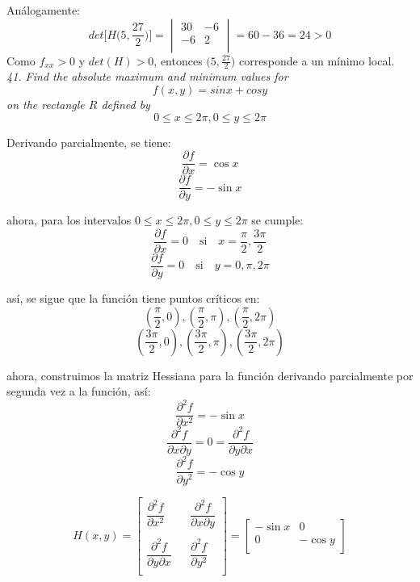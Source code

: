 \documentclass[a4paper,12pt]{article}
\begin{document}
				Análogamente:\\
				$$det \Big[H \Big(5, \frac{27}{2}\Big)\Big] =
						\begin{vmatrix}
							30 & -6 \\
							-6  & 2 \\
						\end{vmatrix} = 60 - 36 = 24 > 0
				$$
				Como $f_{xx} > 0$ y $det(H) > 0$, entonces $\Big(5, \frac{27}{2}\Big)$
				corresponde a un mínimo local.\\



	\textit{41. Find the absolute maximum and minimum values for
		$$f(x, y) = sin x + cos y$$ on the rectangle $R$ defined by
		$$0 \leq x \leq 2\pi, 0 \leq y \leq 2\pi$$}

		Derivando parcialmente, se tiene:
		$$\frac{\partial f}{\partial x} = \cos x $$
		$$\frac{\partial f}{\partial y} = - \sin x $$

		ahora, para los intervalos $0 \leq x \leq 2\pi, 0 \leq y \leq 2\pi$
		se cumple:
			$$\frac{\partial f}{\partial x} = 0 \quad \text{si} \quad
				x=\frac{\pi}{2}, \frac{3\pi}{2}$$
			$$\frac{\partial f}{\partial y} = 0 \quad \text{si} \quad
				y=0, \pi, 2\pi$$

		así, se sigue que la función tiene puntos críticos en:
			$$(\frac{\pi}{2}, 0), (\frac{\pi}{2}, \pi), (\frac{\pi}{2}, 2\pi)$$
			$$(\frac{3\pi}{2}, 0), (\frac{3\pi}{2}, \pi), (\frac{3\pi}{2}, 2\pi)$$

		ahora, construimos la matriz Hessiana para la función derivando
		parcialmente por segunda vez a la función, así:
			$$ \frac{\partial^2f}{\partial x^2} = -\sin x$$
			$$ \frac{\partial^2f}{\partial x\partial y} = 0 = \frac{\partial^2f}{\partial y\partial x}$$
			$$ \frac{\partial^2f}{\partial y^2} = - \cos y$$

			$$H(x,y) = \begin{bmatrix}
    					\dfrac{\partial^2f}{\partial x^2} & & \dfrac{\partial^2f}{\partial x\partial y} \\
    					& & \\
    					\dfrac{\partial^2f}{\partial y\partial x}&  & \dfrac{\partial^2f}{\partial y^2} \\
						\end{bmatrix} =
						\begin{bmatrix}
			    			-\sin x & 0 \\
			    			0  & - \cos y \\
						\end{bmatrix}
						$$
\end{document}
